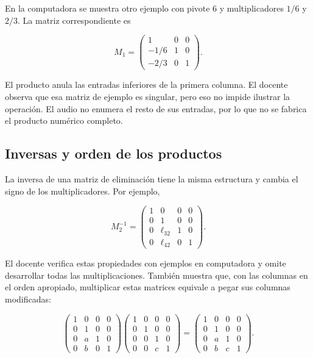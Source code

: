 \documentclass[12pt,a4paper]{article}
\begin{document}
En la computadora se muestra otro ejemplo con pivote 6 y multiplicadores $1/6$ y $2/3$. La matriz correspondiente es

\[
M_1=\begin{pmatrix}1&0&0\\-1/6&1&0\\-2/3&0&1\end{pmatrix}.
\]

El producto anula las entradas inferiores de la primera columna. El docente observa que esa matriz de ejemplo es singular, pero eso no impide ilustrar la operación. El audio no enumera el resto de sus entradas, por lo que no se fabrica el producto numérico completo.

\subsection{Inversas y orden de los productos}

La inversa de una matriz de eliminación tiene la misma estructura y cambia el signo de los multiplicadores. Por ejemplo,

\[
M_2^{-1}=\begin{pmatrix}
1&0&0&0\\0&1&0&0\\0&\ell_{32}&1&0\\0&\ell_{42}&0&1
\end{pmatrix}.
\]

El docente verifica estas propiedades con ejemplos en computadora y omite desarrollar todas las multiplicaciones. También muestra que, con las columnas en el orden apropiado, multiplicar estas matrices equivale a pegar sus columnas modificadas:

\[
\begin{pmatrix}1&0&0&0\\0&1&0&0\\0&a&1&0\\0&b&0&1\end{pmatrix}
\begin{pmatrix}1&0&0&0\\0&1&0&0\\0&0&1&0\\0&0&c&1\end{pmatrix}
=\begin{pmatrix}1&0&0&0\\0&1&0&0\\0&a&1&0\\0&b&c&1\end{pmatrix}.
\]
\end{document}

